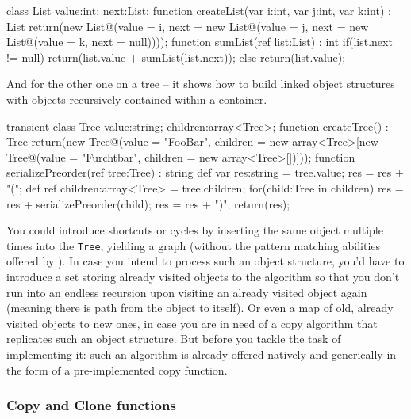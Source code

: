 \begin{example}
\begin{grgen}
class List {
  value:int;
  next:List;
}
function createList(var i:int, var j:int, var k:int) : List
{
  return(new List@(value = i, next = new List@(value = j, next = new List@(value = k, next = null))));
}
function sumList(ref list:List) : int
{
  if(list.next != null) {
    return(list.value + sumList(list.next));
  } else {
    return(list.value);
  }
}
\end{grgen}
\end{example}

And for the other one on a tree -- it shows how to build linked object structures with objects recursively contained within a container.

\begin{example}
\begin{grgen}
transient class Tree {
  value:string;
  children:array<Tree>;
}
function createTree() : Tree
{
  return(new Tree@(value = "FooBar", children = new array<Tree>[new Tree@(value = "Furchtbar", children = new array<Tree>[])]));
}
function serializePreorder(ref tree:Tree) : string
{
  def var res:string = tree.value;
  res = res + "(";
  def ref children:array<Tree> = tree.children;
  for(child:Tree in children)
  {
    res = res + serializePreorder(child);
  }
  res = res + ")";
  return(res);
}
\end{grgen}
\end{example}

You could introduce shortcuts or cycles by inserting the same object multiple times into the \texttt{Tree}, yielding a graph (without the pattern matching abilities offered by \GrG).
In case you intend to process such an object structure, you'd have to introduce a set storing already visited objects to the algorithm so that you don't run into an endless recursion upon visiting an already visited object again (meaning there is path from the object to itself).
Or even a map of old, already visited objects to new ones, in case you are in need of a copy algorithm that replicates such an object structure.
But before you tackle the task of implementing it: such an algorithm is already offered natively and generically in the form of a pre-implemented copy function.


\subsubsection{Copy and Clone functions}\label{subsec:copynclonefunctions}

